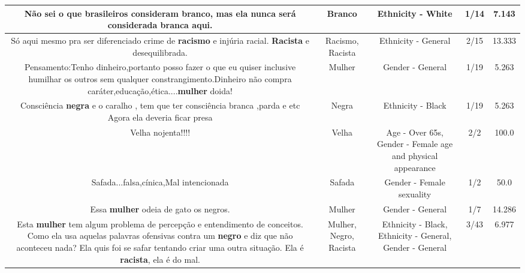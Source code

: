 \documentclass[11pt]{article}
\newlength\mylength
\begin{document}
\begin{center}
\begin{longtable}{|C{.65\mylength}|C{.30\mylength}|C{.12\mylength}|C{.12\mylength}|C{.12\mylength}|}
  \small Não sei o que brasileiros consideram \textbf{branco}, mas ela nunca será considerada branca aqui.\normalsize   & Branco & Ethnicity - White & 1/14 & 7.143 \\  \hline
  \small Só aqui mesmo pra ser diferenciado crime de \textbf{racismo} e injúria racial.  \textbf{Racista} e desequilibrada.\normalsize   & Racismo, Racista & Ethnicity - General & 2/15 & 13.333 \\  \hline
  \small Pensamento:Tenho dinheiro,portanto posso fazer o que eu quiser inclusive humilhar os outros sem qualquer constrangimento.Dinheiro não compra caráter,educação,ética....\textbf{mulher} doida!\normalsize   & Mulher & Gender - General & 1/19 & 5.263 \\  \hline
  \small Consciência \textbf{negra} e o caralho , tem que ter consciência branca ,parda e etc Agora ela deveria ficar presa\normalsize   & Negra & Ethnicity - Black & 1/19 & 5.263 \\  \hline
  \small Velha nojenta!!!!\normalsize   & Velha & Age - Over 65s, Gender - Female age and physical appearance & 2/2 & 100.0 \\  \hline
  \small Safada...falsa,cínica,Mal intencionada\normalsize   & Safada & Gender - Female sexuality & 1/2 & 50.0 \\  \hline
  \small Essa \textbf{mulher} odeia de gato os negros.\normalsize   & Mulher & Gender - General & 1/7 & 14.286 \\  \hline
  \small Esta \textbf{mulher}  tem algum problema de percepção e entendimento de conceitos. Como ela usa aquelas palavras ofensivas contra um \textbf{negro} e diz que não aconteceu nada? Ela quis foi se safar tentando criar uma outra situação. Ela é \textbf{racista}, ela é do mal.\normalsize   & Mulher, Negro, Racista & Ethnicity - Black, Ethnicity - General, Gender - General & 3/43 & 6.977 \\  \hline

\end{longtable}
\end{center}
\end{document}
